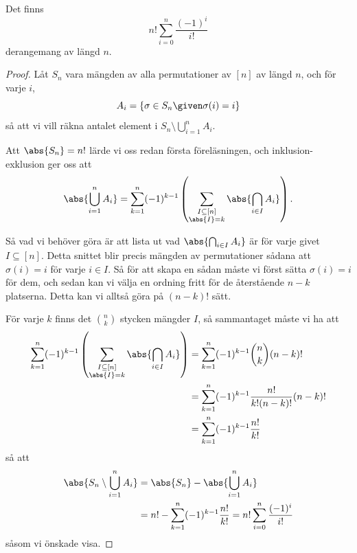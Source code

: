 \documentclass[nobib]{tufte-handout}
\begin{document}
\begin{theorem}
  Det finns
  $$n!\sum_{i=0}^{n} \frac{(-1)^i}{i!}$$
  derangemang av längd $n$.

  \begin{proof}
    Låt $S_n$ vara mängden av alla permutationer av $[n]$ av längd $n$, och för varje $i$,
    $$A_i = \left\{\sigma \in S_n \given \sigma(i) = i\right\}$$
    så att vi vill räkna antalet element i $S_n \setminus \bigcup_{i=1}^n A_i$.

    Att $\abs{S_n} = n!$ lärde vi oss redan första föreläsningen, och inklusion-exklusion ger oss att
    $$\abs{\bigcup_{i=1}^n A_i} = \sum_{k=1}^{n} (-1)^{k-1}\left(\sum_{\substack{I \subseteq [n]\\\abs{I} = k}} \abs{\bigcap_{i \in I} A_i}\right).$$

    Så vad vi behöver göra är att lista ut vad $\abs{\bigcap_{i \in I} A_i}$ är för varje givet $I \subseteq [n]$. Detta snittet blir precis mängden av permutationer sådana att $\sigma(i) = i$ för varje $i\in I$. Så för att skapa en sådan måste vi först sätta $\sigma(i) = i$ för dem, och sedan kan vi välja en ordning fritt för de återstående $n-k$ platserna. Detta kan vi alltså göra på $(n-k)!$ sätt.

    För varje $k$ finns det $\binom{n}{k}$ stycken mängder $I$, så sammantaget måste vi ha att 
    \begin{align*}
      \sum_{k=1}^{n} (-1)^{k-1}\left(\sum_{\substack{I \subseteq [n]\\\abs{I} = k}} \abs{\bigcap_{i \in I} A_i}\right) &= \sum_{k=1}^{n} (-1)^{k-1}\binom{n}{k} (n-k)!\\
      &= \sum_{k=1}^{n} (-1)^{k-1}\frac{n!}{k!(n-k)!}(n-k)!\\
      &= \sum_{k=1}^{n} (-1)^{k-1}\frac{n!}{k!}
    \end{align*}
    så att
    \begin{align*}
      \abs{S_n \setminus \bigcup_{i=1}^n A_i} &= \abs{S_n} - \abs{\bigcup_{i=1}^n A_i}\\
      &= n! - \sum_{k=1}^{n} (-1)^{k-1}\frac{n!}{k!} = n!\sum_{i=0}^{n} \frac{(-1)^i}{i!}
    \end{align*}
    såsom vi önskade visa.
  \end{proof}
\end{theorem}
\end{document}
